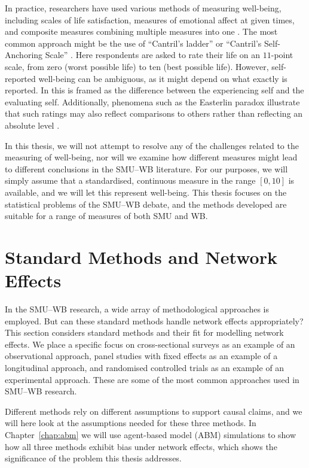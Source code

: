 In practice, researchers have used various methods of measuring well-being, including scales of life satisfaction, measures of emotional affect at given times, and composite measures combining multiple measures into one \parencite{Diener1984}. The most common approach might be the use of ``Cantril's ladder'' or ``Cantril's Self-Anchoring Scale'' \parencite[p.~22]{Cantril1965}. Here respondents are asked to rate their life on an $11$-point scale, from zero (worst possible life) to ten (best possible life). However, self-reported well-being can be ambiguous, as it might depend on what exactly is reported. In \textcite[Ch.~1]{Dolan2014} this is framed as the difference between the experiencing self and the evaluating self. Additionally, phenomena such as the Easterlin paradox illustrate that such ratings may also reflect comparisons to others rather than reflecting an absolute level \parencite[Sec.~3]{Easterlin1974}.

In this thesis, we will not attempt to resolve any of the challenges related to the measuring of well-being, nor will we examine how different measures might lead to different conclusions in the SMU--WB literature. For our purposes, we will simply assume that a standardised, continuous measure in the range $[0, 10]$ is available, and we will let this represent well-being. This thesis focuses on the statistical problems of the SMU--WB debate, and the methods developed are suitable for a range of measures of both SMU and WB\@.

\section{Standard Methods and Network Effects}
\label{sec:intro:causal}
In the SMU--WB research, a wide array of methodological approaches is employed. But can these standard methods handle network effects appropriately? This section considers standard methods and their fit for modelling network effects. We place a specific focus on cross-sectional surveys as an example of an observational approach, panel studies with fixed effects as an example of a longitudinal approach, and randomised controlled trials as an example of an experimental approach. These are some of the most common approaches used in SMU--WB research.

Different methods rely on different assumptions to support causal claims, and we will here look at the assumptions needed for these three methods. In Chapter~\ref{chap:abm} we will use agent-based model (ABM) simulations to show how all three methods exhibit bias under network effects, which shows the significance of the problem this thesis addresses.

